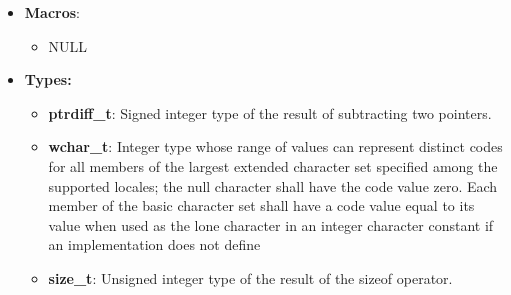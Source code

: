 \documentclass{report}
\begin{document}
    \pagebreak 
    \begin{itemize}
        \item \textbf{Macros}:
            \begin{itemize}
                \item NULL
            \end{itemize}
        \item \textbf{Types:}
            \begin{itemize}
                \item \textbf{ptrdiff\_t}: Signed integer type of the result of subtracting two pointers.
                \item \textbf{wchar\_t}:   Integer type whose range of values can represent distinct codes for all members of the largest extended character set specified among the supported locales; the null character shall have the code value zero. Each member of the basic character set shall have a code value equal to its value when used as the lone character in an integer character constant if an implementation does not define 
                \item \textbf{size\_t}: Unsigned integer type of the result of the sizeof operator.
            \end{itemize}
    \end{itemize}

    \pagebreak 
\end{document}
